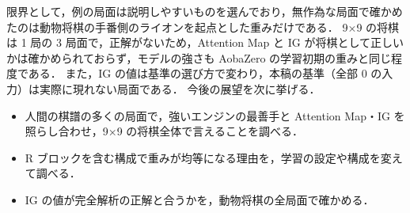 \documentclass[submit]{ipsj}
\begin{document}
限界として，例の局面は説明しやすいものを選んでおり，無作為な局面で確かめたのは動物将棋の手番側のライオンを起点とした重みだけである．
9×9 の将棋は 1 局の 3 局面で，正解がないため，Attention Map と IG が将棋として正しいかは確かめられておらず，モデルの強さも AobaZero の学習初期の重みと同じ程度である．
また，IG の値は基準の選び方で変わり，本稿の基準（全部 0 の入力）は実際に現れない局面である．
今後の展望を次に挙げる．
\begin{itemize}
  \item 人間の棋譜の多くの局面で，強いエンジンの最善手と Attention Map・IG を照らし合わせ，9×9 の将棋全体で言えることを調べる．
  \item R ブロックを含む構成で重みが均等になる理由を，学習の設定や構成を変えて調べる．
  \item IG の値が完全解析の正解と合うかを，動物将棋の全局面で確かめる．
\end{itemize}
\end{document}
